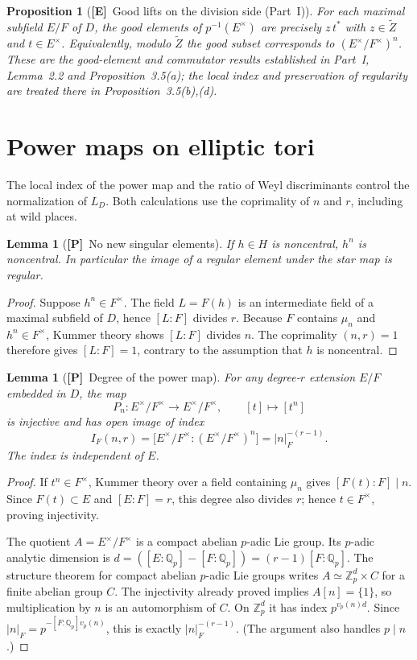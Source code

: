\documentclass[11pt]{article}
\newcommand{\tZ}{\widetilde Z}
\newcommand{\Ptag}{\textnormal{\textbf{[P]}}}
\newcommand{\Etag}{\textnormal{\textbf{[E]}}}
\theoremstyle{plain}
\newtheorem{lemma}[theorem]{Lemma}
\newtheorem{proposition}[theorem]{Proposition}
\theoremstyle{definition}
\begin{document}
\begin{proposition}[\Etag\ Good lifts on the division side (Part~I)]\label{prop:good}
For each maximal subfield $E/F$ of $D$, the good elements of
$p^{-1}(E^\times)$ are precisely $z\,t^*$ with $z\in\tZ$ and
$t\in E^\times$. Equivalently, modulo $\tZ$ the good subset
corresponds to $(E^\times/F^\times)^n$. These are the good-element
and commutator results established in Part~I, Lemma~2.2 and
Proposition~3.5(a); the local index and preservation of regularity
are treated there in Proposition~3.5(b),(d).
\end{proposition}

\section{Power maps on elliptic tori}\label{sec:power}
The local index of the power map and the ratio of Weyl discriminants
control the normalization of $L_D$. Both calculations use the
coprimality of $n$ and $r$, including at wild places.
\begin{lemma}[\Ptag\ No new singular elements]\label{lem:regular}
If $h\in H$ is noncentral, $h^n$ is noncentral. In particular the image of a regular element under the star map is regular.
\end{lemma}
\begin{proof}
Suppose $h^n\in F^\times$. The field $L=F(h)$ is an intermediate field of a maximal subfield of $D$, hence $[L:F]$ divides $r$. Because $F$ contains $\mu_n$ and $h^n\in F^\times$, Kummer theory shows $[L:F]$ divides $n$. The coprimality $(n,r)=1$ therefore gives $[L:F]=1$, contrary to the assumption that $h$ is noncentral.
\end{proof}

\begin{lemma}[\Ptag\ Degree of the power map]\label{lem:index}
For any degree-$r$ extension $E/F$ embedded in $D$, the map
\[
P_n:E^\times/F^\times\longrightarrow E^\times/F^\times,\qquad [t]\longmapsto[t^n]
\]
is injective and has open image of index
\begin{equation}\label{eq:index}
I_F(n,r)=\bigl[E^\times/F^\times:(E^\times/F^\times)^n\bigr]
=|n|_F^{-(r-1)}.
\end{equation}
The index is independent of $E$.
\end{lemma}
\begin{proof}
If $t^n\in F^\times$, Kummer theory over a field containing $\mu_n$ gives $[F(t):F]\mid n$. Since $F(t)\subset E$ and $[E:F]=r$, this degree also divides $r$; hence $t\in F^\times$, proving injectivity.

The quotient $A=E^\times/F^\times$ is a compact abelian $p$-adic Lie group. Its $p$-adic analytic dimension is $d=([E:\mathbb Q_p]-[F:\mathbb Q_p])=(r-1)[F:\mathbb Q_p]$. The structure theorem for compact abelian $p$-adic Lie groups writes $A\simeq \mathbb Z_p^d\times C$ for a finite abelian group $C$. The injectivity already proved implies $A[n]=\{1\}$, so multiplication by $n$ is an automorphism of $C$. On $\mathbb Z_p^d$ it has index $p^{v_p(n)d}$. Since $|n|_F=p^{-[F:\mathbb Q_p]v_p(n)}$, this is exactly $|n|_F^{-(r-1)}$. (The argument also handles $p\mid n$.)
\end{proof}
\end{document}
